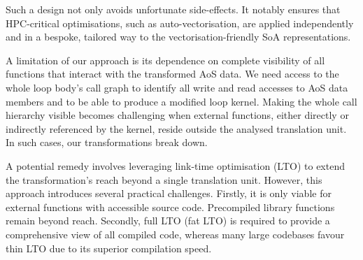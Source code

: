 Such a design not only avoids unfortunate side-effects.
It notably ensures that HPC-critical optimisations, such as auto-vectorisation, are applied independently and in a bespoke, tailored way to the vectorisation-friendly SoA representations.


A limitation of our approach is its dependence on complete visibility of all functions that interact with the transformed AoS data. 
We need access to the whole loop body's call graph to identify all write and read accesses to AoS data members and to be able to produce a modified loop kernel.
Making the whole call hierarchy visible becomes challenging when external functions, either directly or indirectly referenced by the kernel, reside outside the analysed translation unit. 
In such cases, our transformations break down.


A potential remedy involves leveraging link-time optimisation (LTO) to extend the transformation’s reach beyond a single translation unit. However, this approach introduces several practical challenges. 
Firstly, it is only viable for external functions with accessible source code.
Precompiled library functions remain beyond reach. 
Secondly, full LTO (fat LTO) is required to provide a comprehensive view of all compiled code, whereas many large codebases favour thin LTO due to its superior compilation speed.
